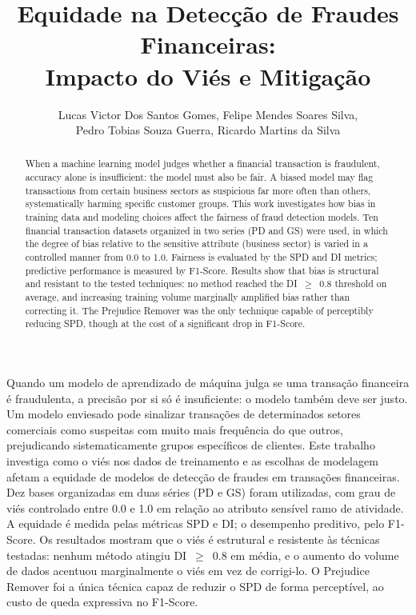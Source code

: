 \documentclass[12pt]{article}
\title{Equidade na Detecção de Fraudes Financeiras:\\ Impacto do Viés e Mitigação}
\author{Lucas Victor Dos Santos Gomes\inst{1}, Felipe Mendes Soares Silva\inst{1},\\
        Pedro Tobias Souza Guerra\inst{1}, Ricardo Martins da Silva\inst{1}}
\begin{document}
\maketitle

\begin{abstract}
When a machine learning model judges whether a financial transaction is fraudulent, accuracy alone is insufficient: the model must also be fair. A biased model may flag transactions from certain business sectors as suspicious far more often than others, systematically harming specific customer groups. This work investigates how bias in training data and modeling choices affect the fairness of fraud detection models. Ten financial transaction datasets organized in two series (PD and GS) were used, in which the degree of bias relative to the sensitive attribute (business sector) is varied in a controlled manner from 0.0 to 1.0. Fairness is evaluated by the SPD and DI metrics; predictive performance is measured by F1-Score. Results show that bias is structural and resistant to the tested techniques: no method reached the DI~$\geq$~0.8 threshold on average, and increasing training volume marginally amplified bias rather than correcting it. The Prejudice Remover was the only technique capable of perceptibly reducing SPD, though at the cost of a significant drop in F1-Score.
\end{abstract}

\begin{resumo}
Quando um modelo de aprendizado de máquina julga se uma transação financeira é fraudulenta, a precisão por si só é insuficiente: o modelo também deve ser justo. Um modelo enviesado pode sinalizar transações de determinados setores comerciais como suspeitas com muito mais frequência do que outros, prejudicando sistematicamente grupos específicos de clientes. Este trabalho investiga como o viés nos dados de treinamento e as escolhas de modelagem afetam a equidade de modelos de detecção de fraudes em transações financeiras. Dez bases organizadas em duas séries (PD e GS) foram utilizadas, com grau de viés controlado entre 0.0 e 1.0 em relação ao atributo sensível ramo de atividade. A equidade é medida pelas métricas SPD e DI; o desempenho preditivo, pelo F1-Score. Os resultados mostram que o viés é estrutural e resistente às técnicas testadas: nenhum método atingiu DI~$\geq$~0.8 em média, e o aumento do volume de dados acentuou marginalmente o viés em vez de corrigi-lo. O Prejudice Remover foi a única técnica capaz de reduzir o SPD de forma perceptível, ao custo de queda expressiva no F1-Score.
\end{resumo}








\end{document}
